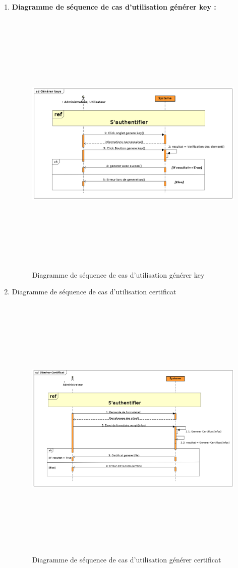 \begin{enumerate}
		 	\item \textbf{Diagramme de séquence de cas d'utilisation générer key :}
		 	\begin{figure}[H]
		 		\centering
		 		\includegraphics[width=18cm, height=13cm]{../Diagrammes/DiagrammeSequences/generatekeys.png}
		 		\caption{Diagramme de séquence de cas d'utilisation générer key}
		 		\label{diaseq2}
		 	\end{figure}
		 	
		 	\item Diagramme de séquence de cas d'utilisation certificat 
		 	\begin{figure}[H]
		 		\centering
		 		\includegraphics[width=18cm, height=13cm]{../Diagrammes/DiagrammeSequences/GenerateCertificat.png}
		 		\caption{Diagramme de séquence de cas d'utilisation générer certificat}
		 		\label{diaseq3}
		 	\end{figure}
		 	

\end{enumerate}
